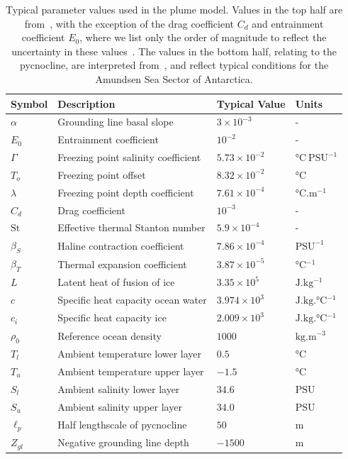 \documentclass[openacc]{rsproca_new}%
\begin{document}
\begin{table}[!h]
\caption{Typical parameter values used in the plume model. Values in the top half are from~\cite{Jenkins1991JGeophysResOceans}, with the exception of the drag coefficient $C_d$ and entrainment coefficient $E_0$, where we list only the order of magnitude to reflect the uncertainty in these values~\cite{Hewitt2020AnnRevFlu}. The values in the bottom half, relating to the pycnocline, are interpreted from~\cite{Jenkins2018NatureGeo}, and reflect typical conditions for the Amundsen Sea Sector of Antarctica.}\label{T:Constants}
\begin{center}
\begin{tabular}{llll}%
\hline
Symbol & Description & Typical Value & Units \\
\hline
$\alpha$ &Grounding line basal slope &$3\times 10^{-3}$ &- \\
$E_0$   & Entrainment coefficient    & $10^{-2}$ & -       \\
$\Gamma$      & Freezing point salinity coefficient & $5.73 \times 10^{-2}	$    	  &  $\si{\celsius}~\text{PSU}^{-1}$     \\
$T_o$      & Freezing point offset & $8.32 \times 10^{-2}	$    	  &  $\si{ \celsius}$     \\
$\lambda$      & Freezing point depth coefficient & $7.61 \times 10^{-4}	$    	  &  $\si{\celsius . \meter^{-1}}$     \\
$C_d$ & Drag coefficient & $10^{-3}$ & - \\
$\mathrm{St}$ & Effective thermal Stanton number & $5.9 \times 10^{-4}$ & -\\
$\beta_S$ & Haline contraction coefficient & $7.86 \times 10^{-4} $ & $\text{PSU}^{-1}$ \\
$\beta_T$ & Thermal expansion coefficient & $3.87\times 10^{-5}$ & $\si{\celsius^{-1}}$ \\
$L$ & Latent heat of fusion of ice & $3.35 \times 10^5 $& $\si{\joule . \kg^{-1}}$\\
$c$ & Specific heat capacity ocean water & $3.974 \times 10^3$ & $\si{\joule .\kilogram .\celsius^{-1}}$\\
$c_i$ & Specific heat capacity ice & $2.009 \times 10^3$ & $\si{\joule . \kilogram .\celsius^{-1}}$\\

$\rho_0$ &  Reference ocean density & $1000$ & $\si{\kilogram . \meter^{-3}}$\\
$T_{l}$ & Ambient temperature lower layer &$0.5$        &  $\si{ \celsius}$   \\
$T_{u}$ & Ambient temperature upper layer &$-1.5$        &  $\si{ \celsius}$  \\
$S_{l}$ & Ambient salinity lower layer &$34.6$        &  $\text{PSU}$   \\
$S_{u}$ & Ambient salinity upper layer &$34.0$        &  $\text{PSU}$  \\
$\ell_p$ & Half lengthscale of pycnocline & $50$ & $\si{\meter}$\\
$Z_{gl}$ & Negative grounding line depth & $-1500$ & $\si{\meter}$\\


\end{tabular}
\end{center}
\end{table}
\end{document}
